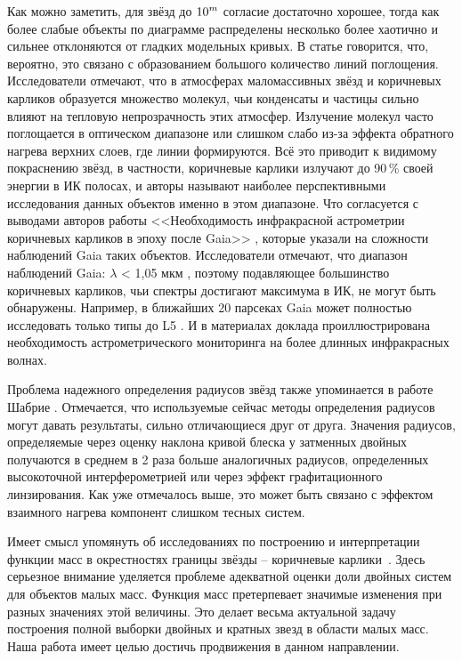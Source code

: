 Как можно заметить, для звёзд до \(\textup{10}^m\) согласие достаточно хорошее, тогда как более слабые объекты по диаграмме распределены несколько более хаотично и сильнее отклоняются от гладких модельных кривых. В статье говорится, что, вероятно, это связано с образованием большого количество линий поглощения. Исследователи отмечают, что в атмосферах маломассивных звёзд и коричневых карликов образуется множество молекул, чьи конденсаты и частицы сильно влияют на тепловую непрозрачность этих атмосфер. Излучение молекул часто поглощается в оптическом диапазоне или слишком слабо из-за эффекта обратного нагрева верхних слоев, где линии формируются. Всё это приводит к видимому покраснению звёзд, в частности, коричневые карлики излучают до 90\,\% своей энергии в ИК полосах, и авторы называют наиболее перспективными исследования данных объектов именно в этом диапазоне. Что согласуется с выводами авторов работы <<Необходимость инфракрасной астрометрии коричневых карликов в эпоху после Gaia>> \cite{2019BAAS...51C.105K}, которые указали на сложности наблюдений Gaia таких объектов. Исследователи отмечают, что диапазон наблюдений Gaia: $\lambda$ < 1,05 мкм \cite{2016A&A...595A...1G}, поэтому подавляющее большинство коричневых карликов, чьи спектры достигают максимума в ИК, не могут быть обнаружены. Например, в ближайших 20 парсеках Gaia может полностью исследовать только типы до L5 \cite{2019ApJS..240...19K}. И в материалах доклада проиллюстрирована необходимость астрометрического мониторинга на более длинных инфракрасных волнах.

Проблема надежного определения радиусов звёзд также упоминается в работе Шабрие \cite{2005astro.ph..9798C}. Отмечается, что используемые сейчас методы определения радиусов могут давать результаты, сильно отличающиеся друг от друга. Значения радиусов, определяемые через оценку наклона кривой блеска у затменных двойных получаются в среднем в 2 раза больше аналогичных радиусов, определенных высокоточной интерферометрией или через эффект графитационного линзирования. Как уже отмечалось выше, это может быть связано с эффектом взаимного нагрева компонент слишком тесных систем.

Имеет смысл упомянуть об исследованиях по построению и интерпретации функции масс в окрестностях границы \glqq звёзды -- коричневые карлики\grqq\ \cite{2015ApJ...800...72T}. Здесь серьезное внимание уделяется проблеме адекватной оценки доли двойных систем для объектов малых масс. Функция масс претерпевает значимые изменения при разных значениях этой величины.  Это делает весьма актуальной задачу построения полной выборки двойных и кратных звезд в области малых масс. Наша работа имеет целью достичь продвижения в данном направлении.

